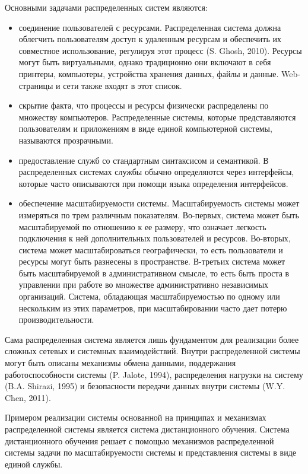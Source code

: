 Основными задачами распределенных систем являются:

\begin{itemize}
\item соединение пользователей с ресурсами. Распределенная система должна облегчить пользователям доступ к удаленным ресурсам и обеспечить их совместное использование, регулируя этот процесс (S. Ghosh, 2010). Ресурсы могут быть виртуальными, однако традиционно они включают в себя принтеры, компьютеры, устройства хранения данных, файлы и данные. Web-страницы и сети также входят в этот список. 
\item скрытие факта, что процессы и ресурсы физически распределены по множеству компьютеров. Распределенные системы, которые представляются пользователям и приложениям в виде единой компьютерной системы, называются прозрачными.
\item предоставление служб со стандартным синтаксисом и семантикой. В распределенных системах службы обычно определяются через интерфейсы, которые часто описываются при помощи языка определения интерфейсов.
\item обеспечение масштабируемости системы. Масштабируемость системы может измеряться по трем различным показателям. Во-первых, система может быть масштабируемой по отношению к ее размеру, что означает легкость подключения к ней дополнительных пользователей и ресурсов. Во-вторых, система может масштабироваться географически, то есть пользователи и ресурсы могут быть разнесены в пространстве. В-третьих система может быть масштабируемой в административном смысле, то есть быть проста в управлении при работе во множестве административно независимых организаций. Система, обладающая масштабируемостью по одному или нескольким из этих параметров, при масштабировании часто дает потерю производительности.
\end{itemize}

Сама распределенная система является лишь фундаментом для реализации более сложных сетевых и системных взаимодействий. Внутри распределенной системы могут быть описаны механизмы обмена данными, поддержания работоспособности системы (P. Jalote, 1994), распределения нагрузки на систему (B.A. Shirazi, 1995) и безопасности передачи данных внутри системы (W.Y. Chen, 2011). 

Примером реализации системы основанной на принципах и механизмах распределенной системы является система дистанционного обучения. Система дистанционного обучения решает с помощью механизмов распределенной системы задачи по масштабируемости системы и представления системы в виде единой службы. 



